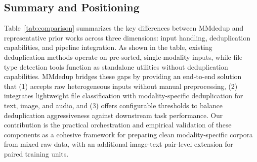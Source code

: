 \documentclass[conference]{IEEEtran}
\begin{document}

\subsection{Summary and Positioning}

Table~\ref{tab:comparison} summarizes the key differences between MMdedup and representative prior works across three dimensions: input handling, deduplication capabilities, and pipeline integration.
As shown in the table, existing deduplication methods operate on pre-sorted, single-modality inputs, while file type detection tools function as standalone utilities without deduplication capabilities. MMdedup bridges these gaps by providing an end-to-end solution that (1) accepts raw heterogeneous inputs without manual preprocessing, (2) integrates lightweight file classification with modality-specific deduplication for text, image, and audio, and (3) offers configurable thresholds to balance deduplication aggressiveness against downstream task performance. Our contribution is the practical orchestration and empirical validation of these components as a cohesive framework for preparing clean modality-specific corpora from mixed raw data, with an additional image-text pair-level extension for paired training units.
\end{document}
